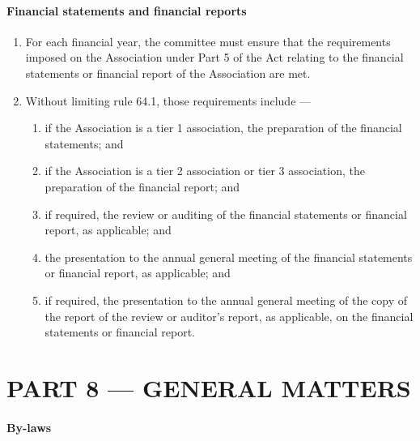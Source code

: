\documentclass[../constitution.tex]{subfiles}
\begin{document}
\hypertarget{financial-statements-and-financial-reports}{%
\subsection{Financial statements and financial reports}\label{financial-statements-and-financial-reports}}

\begin{enumerate}

\item For each financial year, the committee must ensure that the requirements imposed on the Association under Part 5 of the Act relating to the financial statements or financial report of the Association are met.
\item Without limiting rule 64.1, those requirements include ---

  \begin{enumerate}
  
  \item if the Association is a tier 1 association, the preparation of the financial statements; and
  \item if the Association is a tier 2 association or tier 3 association, the preparation of the financial report; and
  \item if required, the review or auditing of the financial statements or financial report, as applicable; and
  \item the presentation to the annual general meeting of the financial statements or financial report, as applicable; and
  \item if required, the presentation to the annual general meeting of the copy of the report of the review or auditor's report, as applicable, on the financial statements or financial report.
  \end{enumerate}
\end{enumerate}

\hypertarget{part-8-general-matters}{%
\part{PART 8 --- GENERAL MATTERS}\label{part-8-general-matters}}

\hypertarget{by-laws}{%
\subsection{By-laws}\label{by-laws}}
\end{document}
